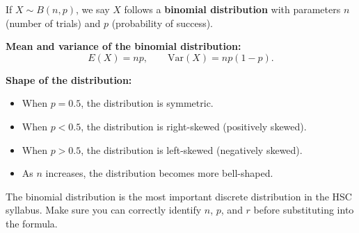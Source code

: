 
If $X \sim B(n, p)$, we say $X$ follows a \textbf{binomial distribution} with parameters $n$ (number of trials) and $p$ (probability of success).

\textbf{Mean and variance of the binomial distribution:}
\[
E(X) = np, \qquad \mathrm{Var}(X) = np(1-p).
\]

\textbf{Shape of the distribution:}
\begin{itemize}[leftmargin=*]
  \item When $p = 0.5$, the distribution is symmetric.
  \item When $p < 0.5$, the distribution is right-skewed (positively skewed).
  \item When $p > 0.5$, the distribution is left-skewed (negatively skewed).
  \item As $n$ increases, the distribution becomes more bell-shaped.
\end{itemize}

\begin{remark}
The binomial distribution is the most important discrete distribution in the HSC syllabus. Make sure you can correctly identify $n$, $p$, and $r$ before substituting into the formula.
\end{remark}

